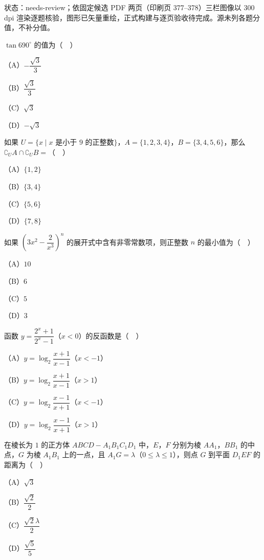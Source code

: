 

状态：needs-review；依固定候选 PDF 两页（印刷页 377–378）三栏图像以 300 dpi 渲染逐题核验，图形已矢量重绘，正式构建与逐页验收待完成。源未列各题分值，不补分值。


\begin{question}
$\tan690^\circ$ 的值为（　）

（A）$-\dfrac{\sqrt3}{3}$

（B）$\dfrac{\sqrt3}{3}$

（C）$\sqrt3$

（D）$-\sqrt3$

\end{question}
\begin{question}
如果 $U=\{x\mid x$ 是小于 $9$ 的正整数$\}$，$A=\{1,2,3,4\}$，$B=\{3,4,5,6\}$，那么 $\complement_UA\cap\complement_UB=$（　）

（A）$\{1,2\}$

（B）$\{3,4\}$

（C）$\{5,6\}$

（D）$\{7,8\}$

\end{question}
\begin{question}
如果 $\left(3x^2-\dfrac{2}{x^3}\right)^n$ 的展开式中含有非零常数项，则正整数 $n$ 的最小值为（　）

（A）$10$

（B）$6$

（C）$5$

（D）$3$

\end{question}
\begin{question}
函数 $y=\dfrac{2^x+1}{2^x-1}$（$x<0$）的反函数是（　）

（A）$y=\log_2\dfrac{x+1}{x-1}$（$x<-1$）

（B）$y=\log_2\dfrac{x+1}{x-1}$（$x>1$）

（C）$y=\log_2\dfrac{x-1}{x+1}$（$x<-1$）

（D）$y=\log_2\dfrac{x-1}{x+1}$（$x>1$）

\Needspace{0.4\textheight}
\end{question}
\begin{question}
在棱长为 $1$ 的正方体 $ABCD-A_1B_1C_1D_1$ 中，$E$，$F$ 分别为棱 $AA_1$，$BB_1$ 的中点，$G$ 为棱 $A_1B_1$ 上的一点，且 $A_1G=\lambda$（$0\leqslant\lambda\leqslant1$），则点 $G$ 到平面 $D_1EF$ 的距离为（　）
\nopagebreak[4]
\begin{center}\end{center}
\nopagebreak[4]
（A）$\sqrt3$

（B）$\dfrac{\sqrt2}{2}$

（C）$\dfrac{\sqrt2\lambda}{2}$

（D）$\dfrac{\sqrt5}{5}$

\Needspace{0.4\textheight}
\end{question}
